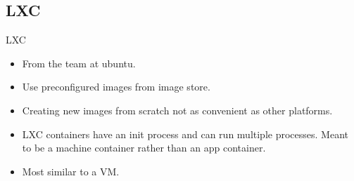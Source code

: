 \subsection{LXC}
\begin{frame}[fragile]{LXC}

\begin{itemize}
\item From the team at ubuntu.
\item Use preconfigured images from image store.
\item Creating new images from scratch not as convenient as other platforms.
\item \color{cobalt}LXC containers have an init process and can run multiple processes. Meant to be a machine container rather than an app container.
\item \color{black}Most similar to a VM.
\end{itemize}

\end{frame}